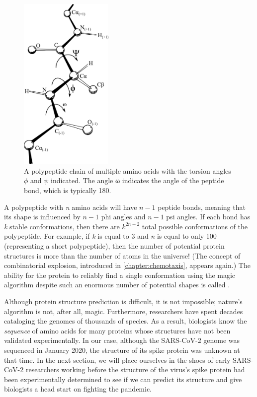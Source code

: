 \begin{figure}[h]
	\centering
	\mySfFamily
	\includegraphics[width = 0.4\textwidth]{../images/torsion_angles.png}
	\caption{A polypeptide chain of multiple amino acids with the torsion angles $\phi$ and $\psi$ indicated. The angle ω indicates the angle of the peptide bond, which is typically 180\textdegree.}
	\label{fig:torsion_angles}
\end{figure}

A polypeptide with \textit{n} amino acids will have $n - 1$ peptide bonds, meaning that its shape is influenced by $n - 1$ phi angles and $n - 1$ psi angles. If each bond has \textit{k} stable conformations, then there are $k^{2n-2}$ total possible conformations of the polypeptide. For example, if \textit{k} is equal to 3 and \textit{n} is equal to only 100 (representing a short polypeptide), then the number of potential protein structures is more than the number of atoms in the universe! (The concept of combinatorial explosion, introduced in \autoref{chapter:chemotaxis}, appears again.) The ability for the protein to reliably find a single conformation using the magic algorithm despite such an enormous number of potential shapes is called .

Although protein structure prediction is difficult, it is not impossible; nature's algorithm is not, after all, magic. Furthermore, researchers have spent decades cataloging the genomes of thousands of species. As a result, biologists know the \textit{sequence} of amino acids for many proteins whose structures have not been validated experimentally. In our case, although the SARS-CoV-2 genome was sequenced in January 2020, the structure of its spike protein was unknown at that time.  In the next section, we will place ourselves in the shoes of early SARS-CoV-2 researchers working before the structure of the virus's spike protein had been experimentally determined to see if we can predict its structure and give biologists a head start on fighting the pandemic.\\


